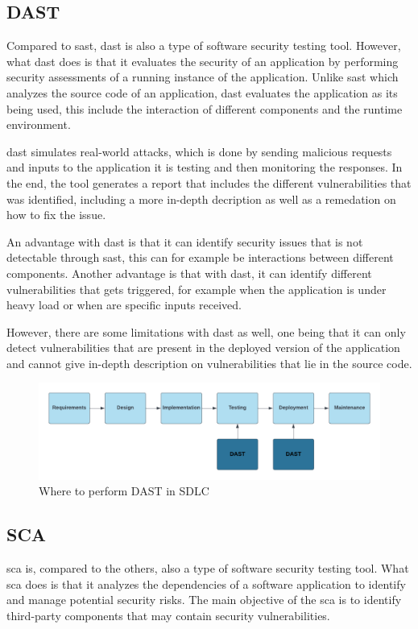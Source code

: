 \newpage
\subsection{DAST}
Compared to \acrshort{sast}, \acrlong{dast} is also a type of software security testing tool. However, what \acrshort{dast} does is that it evaluates the security of an application by performing security assessments of a running instance of the application. Unlike \acrshort{sast} which analyzes the source code of an application, \acrshort{dast} evaluates the application as its being used, this include the interaction of different components and the runtime environment. 

\acrshort{dast} simulates real-world attacks, which is done by sending malicious requests and inputs to the application it is testing and then monitoring the responses. In the end, the tool generates a report that includes the different vulnerabilities that was identified, including a more in-depth decription as well as a remedation on how to fix the issue. \cite{dast}

An advantage with \acrshort{dast} is that it can identify security issues that is not detectable through \acrshort{sast}, this can for example be interactions between different components. Another advantage is that with \acrshort{dast}, it can identify different vulnerabilities that gets triggered, for example when the application is under heavy load or when are specific inputs received.

However, there are some limitations with \acrshort{dast} as well, one being that it can only detect vulnerabilities that are present in the deployed version of the application and cannot give in-depth description on vulnerabilities that lie in the source code.

\begin{figure}[htp]
    \centering
    \includegraphics[width=1\columnwidth]{Images/DAST.png}
    \caption{Where to perform DAST in SDLC} 
    \label{fig:my_label}
\end{figure}

\newpage

\subsection{SCA}
\acrlong{sca} is, compared to the others, also a type of software security testing tool. What \acrshort{sca} does is that it analyzes the dependencies of a software application to identify and manage potential security risks. The main objective of the \acrshort{sca} is to identify third-party components that may contain security vulnerabilities. \cite{sca}

